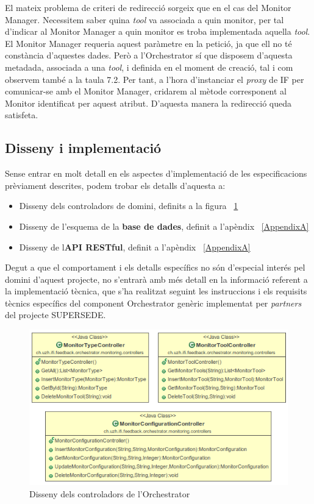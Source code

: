 El mateix problema de criteri de redirecció sorgeix que en el cas del Monitor Manager. Necessitem saber quina \textit{tool} va associada a quin monitor, per tal d'indicar al Monitor Manager a quin monitor es troba implementada aquella \textit{tool}. El Monitor Manager requeria aquest paràmetre en la petició, ja que ell no té constància d'aquestes dades. Però a l'Orchestrator sí que disposem d'aquesta metadada, associada a una \textit{tool}, i definida en el moment de creació, tal i com observem també a la taula 7.2. Per tant, a l'hora d'instanciar el \textit{proxy} de IF per comunicar-se amb el Monitor Manager, cridarem al mètode corresponent al Monitor identificat per aquest atribut. D'aquesta manera la redirecció queda satisfeta.\\

\subsection{Disseny i implementació}

Sense entrar en molt detall en els aspectes d'implementació de les especificacions prèviament descrites, podem trobar els detalls d'aquesta a: 

\begin{itemize}
\item Disseny dels controladors de domini, definits a la figura ~\ref{fig:orchestrator}
\item Disseny de l'esquema de la \textbf{base de dades}, definit a l'apèndix ~\ref{AppendixA}
\item Disseny de l\textbf{API RESTful}, definit a l'apèndix ~\ref{AppendixA}
\end{itemize}

Degut a que el comportament i els detalls específics no són d'especial interés pel domini d'aquest projecte, no s'entrarà amb més detall en la informació referent a la implementació tècnica, que s'ha realitzat seguint les instruccions i els requisits tècnics específics del component Orchestrator genèric implementat per \textit{partners} del projecte SUPERSEDE.

\begin{figure}[!h]
\centering
\includegraphics[width=14cm]{Figures/orchestrator}
\decoRule
\caption{Disseny dels controladors de l'Orchestrator}
\label{fig:orchestrator}
\end{figure}